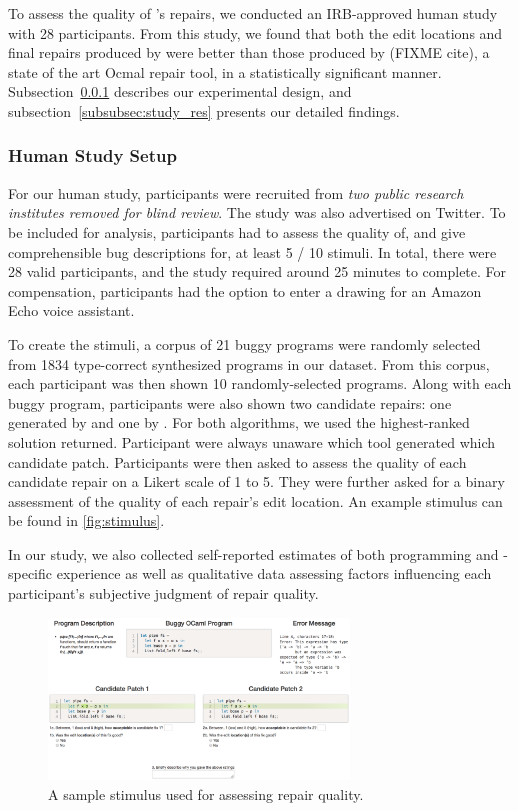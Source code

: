 To assess the quality of \toolname's repairs, we conducted an IRB-approved human
study with 28 participants. From this study, we found that both the edit
locations and final repairs produced by \toolname were better than those
produced by \seminal (FIXME cite), a state of the art Ocmal repair tool, in a
statistically significant manner. Subsection~\ref{subsubsec:study_setup}
describes our experimental design, and subsection~\ref{subsubsec:study_res}
presents our detailed findings.

\subsubsection{Human Study Setup}
\label{subsubsec:study_setup}


For our human study, participants were recruited from \emph{two public research
institutes removed for blind review}. The study was also advertised on Twitter.
To be included for analysis, participants had to assess the quality of, and give
comprehensible bug descriptions for, at least 5 / 10 stimuli. In total, there were
28 valid participants, and the study required around 25 minutes to complete. For
compensation, participants had the option to enter a drawing for an Amazon Echo
voice assistant.

To create the stimuli, a corpus of 21 buggy programs were randomly selected from
1834 type-correct synthesized programs in our dataset.
From this corpus, each participant was
then shown 10 randomly-selected programs. Along with each buggy program,
participants were also shown two candidate repairs: one generated by \toolname
and one by \seminal. For both algorithms, we used the highest-ranked solution
returned. Participant were always unaware which tool generated which
candidate patch. Participants were then asked to assess the quality of each
candidate repair on a Likert scale of 1 to 5. They were further asked for a
binary assessment of the quality of each repair's edit location. An example
stimulus can be found in \autoref{fig:stimulus}.

In our study, we also collected self-reported estimates of both programming and
\ocaml-specific experience as well as qualitative data assessing factors
influencing each participant's subjective judgment of repair quality.

\begin{figure}
  \includegraphics[width=8cm]{SampleStimuli.png}
  \caption{A sample stimulus used for assessing repair quality.}
  \label{fig:stimulus}
\end{figure}

